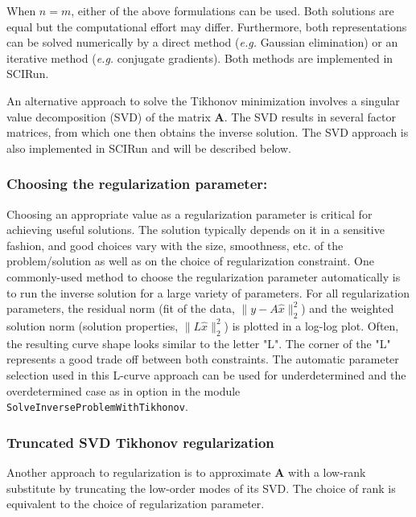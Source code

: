 When $n=m$, either of the above formulations can be used.
Both solutions are equal but the computational effort may differ. Furthermore, both representations can be solved numerically by a direct method (\textit{e.g.} Gaussian elimination) or an iterative method (\textit{e.g.} conjugate gradients). Both methods are implemented in SCIRun.

An alternative approach to solve the Tikhonov minimization involves a singular value
decomposition (SVD) of the matrix $\mathbf{A}$. The SVD results in several factor matrices, from which one then obtains the inverse solution. The SVD approach is also implemented in SCIRun and will be described below.

\subsubsection{Choosing the regularization parameter:}
\label{sec:math_regparam}

Choosing an appropriate value as a regularization parameter is critical for achieving useful solutions.
The solution typically depends on it in a sensitive fashion, and good
choices vary with the size, smoothness, etc. of the problem/solution as well as on the
choice of regularization constraint. One commonly-used method to choose the
regularization parameter automatically is to run the inverse solution for a
large variety of parameters. For all regularization parameters, the residual
norm (fit of the data, $\| y - A \hat{x} \|^{2}_{2} $) and the weighted
solution norm (solution properties, $\|L\hat{x} \|^{2}_{2}$) is plotted in a log-log plot. Often,
the resulting curve shape looks similar to the letter
"L". The corner of the "L" represents a good trade off between both
constraints. The automatic parameter selection used in this L-curve approach
can be used for underdetermined and the overdetermined case as in option in
the module {\tt SolveInverseProblemWithTikhonov}.

\subsubsection{Truncated SVD Tikhonov regularization}

Another approach to regularization is to approximate $\mathbf{A}$ with a
low-rank substitute by truncating the low-order modes of its SVD. The
choice of rank is equivalent to the choice of regularization parameter.

